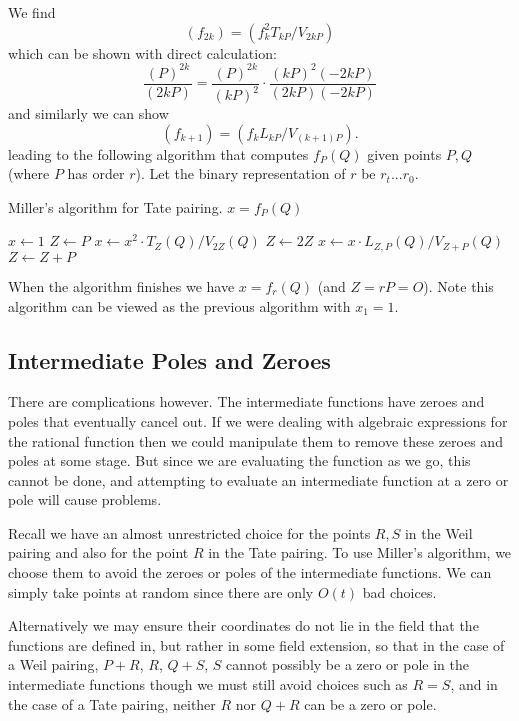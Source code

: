 We find
\[
(f_{2k}) = (f_k^2 T_{kP} / V_{2kP} )
\]
which can be shown with direct calculation:
\[
\frac{(P)^{2k}}{(2kP)} =
\frac{(P)^{2k}}{(kP)^2} \cdot
\frac{(kP)^2 (-2kP)}{(2kP)(-2kP)}
\]
and similarly we can show
\[
(f_{k+1}) = (f_k L_{kP} / V_{(k+1)P}).
\]
leading to the following algorithm that
computes $f_P(Q)$ given points $P,Q$ (where $P$ has order $r$).
Let the binary representation of $r$ be $r_t ... r_0$.

\begin{algorithm}
\caption{Miller's algorithm for Tate pairing. $x = f_P(Q)$}
\begin{algorithmic}[1]
\STATE $x \gets 1$
\STATE $Z \gets P$
    \STATE $x \gets x^2 \cdot T_Z(Q) / V_{2Z}(Q)$
    \STATE $Z \gets 2Z$
	\STATE $x \gets x \cdot L_{Z,P}(Q) / V_{Z+P}(Q)$
	\STATE $Z \gets Z + P$
    \ENDIF
\ENDFOR
\end{algorithmic}
\end{algorithm}

When the algorithm finishes we have $x = f_r(Q)$ (and $Z = rP = O$).
Note this algorithm can be viewed as the previous algorithm with $x_1 = 1$.

\subsection {Intermediate Poles and Zeroes}

There are complications however. The intermediate functions have zeroes
and poles that eventually cancel out. If we were dealing with algebraic
expressions for the rational function then we could manipulate
them to remove these zeroes and poles at some stage.
But since we are evaluating the function as we go,
this cannot be done, and attempting to evaluate an
intermediate function at a zero
or pole will cause problems.

Recall we have an almost unrestricted choice for the points $R, S$ in
the Weil pairing and also for the point $R$
in the Tate pairing. To use Miller's algorithm, we choose them
to avoid the zeroes or poles
of the intermediate functions. We can simply
take points at random since there are only $O(t)$ bad choices.

Alternatively we may ensure their coordinates do not lie in the
field that the functions are defined in, but rather in some field
extension, so that in the case of a Weil pairing, $P+R$, $R$, $Q+S$, $S$
cannot possibly be a zero or pole in the intermediate functions
though we must still avoid choices such as $R = S$,
and in the case of a Tate pairing, neither $R$ nor $Q + R$
can be a zero or pole.


